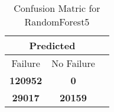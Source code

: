 \begin{table}[] 
\caption{Confusion Matric for RandomForest5} 
\label{Table: Prediction Accuracy-DMDRandomForest5OnlySunEKF-combinationReflectionperfectNoFailurePrediction-Reflection} 
\centering 
\begin{tabular} 
 {@{}ccc@{}} 
\toprule 
\multicolumn{2}{c}{\textbf{Predicted}}
 \\ \midrule 
\multicolumn{1}{|c|}{Failure} & 
\multicolumn{1}{c|}{No Failure}
 \\ \midrule 
\multicolumn{1}{|c|}{\color{green}\textbf{120952}} & 
\multicolumn{1}{c|}{\color{red}\textbf{0}}
 \\ \midrule 
\multicolumn{1}{|c|}{\color{red}\textbf{29017}} & 
\multicolumn{1}{c|}{\color{green}\textbf{20159}}
 \\ \bottomrule 
\end{tabular} 
\end{table} 
